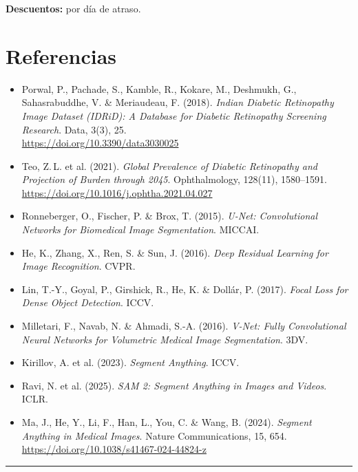 \documentclass[11pt, a4paper]{article}
\newcommand{\completar}[1]{\leavevmode{\color{StanfordRed}\textbf{[#1]}}}
\begin{document}
\vspace{0.6em}
\noindent
\textbf{Descuentos:} \completar{\_\_ d\'ecimas} por d\'ia de atraso.

\section{Referencias}

\begin{itemize}
	\item Porwal, P., Pachade, S., Kamble, R., Kokare, M., Deshmukh, G., Sahasrabuddhe, V. \& Meriaudeau, F. (2018). \emph{Indian Diabetic Retinopathy Image Dataset (IDRiD): A Database for Diabetic Retinopathy Screening Research}. Data, 3(3), 25.\\ \url{https://doi.org/10.3390/data3030025}
	\item Teo, Z.\,L. et al. (2021). \emph{Global Prevalence of Diabetic Retinopathy and Projection of Burden through 2045}. Ophthalmology, 128(11), 1580--1591.\\ \url{https://doi.org/10.1016/j.ophtha.2021.04.027}
	\item Ronneberger, O., Fischer, P. \& Brox, T. (2015). \emph{U-Net: Convolutional Networks for Biomedical Image Segmentation}. MICCAI.
	\item He, K., Zhang, X., Ren, S. \& Sun, J. (2016). \emph{Deep Residual Learning for Image Recognition}. CVPR.
	\item Lin, T.-Y., Goyal, P., Girshick, R., He, K. \& Doll\'ar, P. (2017). \emph{Focal Loss for Dense Object Detection}. ICCV.
	\item Milletari, F., Navab, N. \& Ahmadi, S.-A. (2016). \emph{V-Net: Fully Convolutional Neural Networks for Volumetric Medical Image Segmentation}. 3DV.
	\item Kirillov, A. et al. (2023). \emph{Segment Anything}. ICCV.
	\item Ravi, N. et al. (2025). \emph{SAM 2: Segment Anything in Images and Videos}. ICLR.
	\item Ma, J., He, Y., Li, F., Han, L., You, C. \& Wang, B. (2024). \emph{Segment Anything in Medical Images}. Nature Communications, 15, 654.\\ \url{https://doi.org/10.1038/s41467-024-44824-z}
\end{itemize}

\vspace{1em}
\hrule
\vspace{0.4em}
\end{document}
